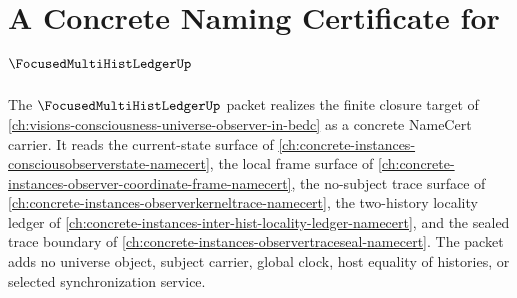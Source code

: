 \chapter{A Concrete Naming Certificate for $\FocusedMultiHistLedgerUp$}
\label{ch:concrete-instances-focused-multi-hist-ledger-namecert}

The $\FocusedMultiHistLedgerUp$ packet realizes the finite closure target of \autoref{ch:visions-consciousness-universe-observer-in-bedc} as a concrete NameCert carrier. It reads the current-state surface of \autoref{ch:concrete-instances-consciousobserverstate-namecert}, the local frame surface of \autoref{ch:concrete-instances-observer-coordinate-frame-namecert}, the no-subject trace surface of \autoref{ch:concrete-instances-observerkerneltrace-namecert}, the two-history locality ledger of \autoref{ch:concrete-instances-inter-hist-locality-ledger-namecert}, and the sealed trace boundary of \autoref{ch:concrete-instances-observertraceseal-namecert}. The packet adds no universe object, subject carrier, global clock, host equality of histories, or selected synchronization service.


